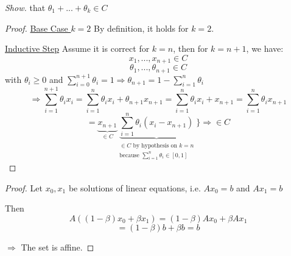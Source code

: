 \emph{Show.} that $\theta_1 + ... + \theta_k \in C$

\begin{proof}

    \underline{Base Case $k = 2$} By definition, it holds for $k = 2$.

    \underline{Inductive Step} Assume it is correct for $k = n$, then for $k = n + 1$, we have:
    $$x_1,...,x_{n+1} \in C$$
    $$\theta_1,...,\theta_{n+1} \in C$$
    with $\theta_i \ge 0$ and $\sum\limits_{i=0}^{n+1} \theta_i = 1 \Rightarrow \theta_{n+1} = 1 - \sum\limits_{i=1}^{n} \theta_i$
    $$\Rightarrow \sum_{i=1}^{n+1} \theta_i x_i = \sum_{i=1}^{n} \theta_i x_i + \theta_{n+1} x_{n+1} = \sum_{i=1}^{n} \theta_i x_i + x_{n+1} = \sum_{i=1}^{n} \theta_i x_{n+1}$$%
    $$= \underbrace{x_{n+1}}_\text{$\in C$} \underbrace{\sum_{i=1}^{n} \theta_i (x_i - x_{n+1})}_{\substack{\text{$\in C$ by hypothesis on $k=n$} \\ \text{because $\sum\limits_{i=1}^{n}\theta_i \in [0,1]$}}} \Biggr\} \Rightarrow \in C $$

\end{proof}





\begin{proof}
    Let $x_0, x_1$ be solutions of linear equations, i.e. $A x_0 = b$ and $A x_1 = b$

    Then $$A((1-\beta)x_0 + \beta x_1) = (1-\beta) A x_0 + \beta A x_1$$$$ = (1-\beta)b + \beta b = b$$

    $\Rightarrow$ The set is affine.
\end{proof}



\bigskip
\bigskip
{}

